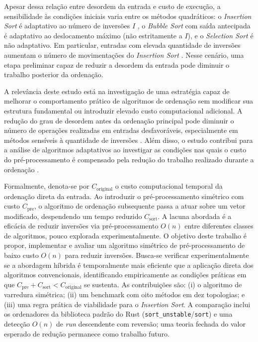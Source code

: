 \documentclass[portuguese]{sbc2025}%
\begin{document}
Apesar dessa relação entre desordem da entrada e custo de execução, a sensibilidade às condições iniciais varia entre os métodos quadráticos: o \emph{Insertion Sort} é adaptativo ao número de inversões $I$ \citep{mannila_measures_1984, estivill-castro_survey_1992}, o \emph{Bubble Sort} com saída antecipada é adaptativo ao deslocamento máximo (não estritamente a $I$), e o \emph{Selection Sort} é não adaptativo. Em particular, entradas com elevada quantidade de inversões aumentam o número de movimentações do \emph{Insertion Sort} \citep{cormen_introduction_2022}. Nesse cenário, uma etapa preliminar capaz de reduzir a desordem da entrada pode diminuir o trabalho posterior da ordenação.

A relevância deste estudo está na investigação de uma estratégia capaz de melhorar o comportamento prático de algoritmos de ordenação sem modificar sua estrutura fundamental ou introduzir elevado custo computacional adicional. A redução do grau de desordem antes da ordenação principal pode diminuir o número de operações realizadas em entradas desfavoráveis, especialmente em métodos sensíveis à quantidade de inversões \citep{estivill-castro_survey_1992, hwang_presorting_2000}. Além disso, o estudo contribui para a análise de algoritmos adaptativos ao investigar as condições nas quais o custo do pré-processamento é compensado pela redução do trabalho realizado durante a ordenação \citep{mannila_measures_1984, hwang_presorting_2000}.

Formalmente, denota-se por $C_{\text{original}}$ o custo computacional temporal da ordenação direta da entrada. Ao introduzir o pré-processamento simétrico com custo $C_{\text{pre}}$, o algoritmo de ordenação subsequente passa a atuar sobre um vetor modificado, despendendo um tempo reduzido $C_{\text{sort}}$. A lacuna abordada é a eficácia de reduzir inversões via pré-processamento $O(n)$ entre diferentes classes de algoritmos, pouco explorada experimentalmente. O objetivo deste trabalho é propor, implementar e avaliar um algoritmo simétrico de pré-processamento de baixo custo $O(n)$ para reduzir inversões. Busca-se verificar experimentalmente se a abordagem híbrida é temporalmente mais eficiente que a aplicação direta dos algoritmos convencionais, identificando empiricamente as condições práticas em que $C_{\text{pre}} + C_{\text{sort}} < C_{\text{original}}$ se sustenta. As contribuições são: (i) o algoritmo de varredura simétrica; (ii) um benchmark com oito métodos em dez topologias; e (iii) uma regra prática de viabilidade para o \emph{Insertion Sort}. A comparação inclui os ordenadores da biblioteca padrão do Rust (\texttt{sort\_unstable}/\texttt{sort}) e uma detecção $O(n)$ de \emph{run} descendente com reversão; uma teoria fechada do valor esperado de redução permanece como trabalho futuro.
\end{document}
